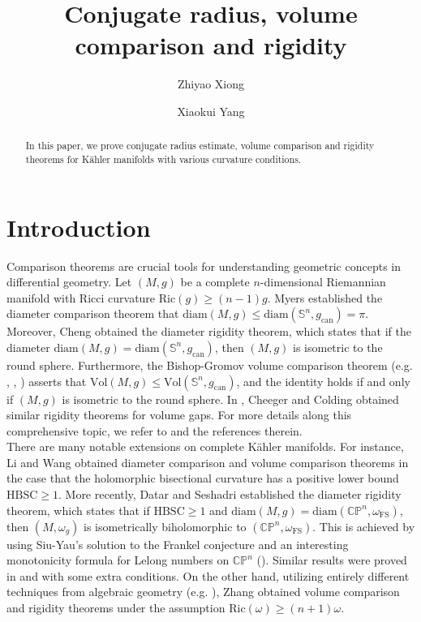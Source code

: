 \documentclass[12pt]{amsart}
\title{Conjugate radius, volume comparison and rigidity}
\author{Zhiyao Xiong}
\author{Xiaokui Yang}
\theoremstyle{plain}
\theoremstyle{definition}
\renewcommand{\S}{{\mathbb S}}
\renewcommand{\>}{\rightarrow}
\newcommand{\C}{{\mathbb C}}
\renewcommand{\P}{{\mathbb P}}
\newcommand{\om}{\omega}
\numberwithin{equation}{section} %
\begin{document}
	
	\begin{abstract} 
		In this paper, we prove conjugate radius estimate, volume comparison and rigidity theorems   for  K\"ahler manifolds with various curvature conditions.  
	\end{abstract}
	
	
	\maketitle
	
	

	
	\section{Introduction}
		
	Comparison theorems are crucial tools for understanding geometric concepts in differential geometry. 
	Let $(M,g)$ be a complete $n$-dimensional Riemannian manifold with Ricci curvature $\mathrm{Ric}(g)\geq (n-1)g$.
	Myers \cite{Mye41} established the diameter comparison theorem that $\mathrm{diam}(M,g)\leq \mathrm{diam}(\S^n,g_{\mathrm{can}})=\pi$.  Moreover,
Cheng \cite{Che75} obtained the diameter rigidity theorem, 
		which states that if the diameter $\mathrm{diam}(M,g)=\mathrm{diam}(\S^n,g_{\mathrm{can}})$, then $(M,g)$ is isometric to the round sphere. 
	Furthermore, the Bishop-Gromov volume comparison theorem (e.g. \cite{BC64}, \cite{Gro07}, \cite{CE08}) asserts that $\mathrm{Vol}(M,g)\leq \mathrm{Vol}(\S^n,g_{\mathrm{can}})$,
		and the identity holds if and only if $(M,g)$ is isometric to the round sphere. 
	In \cite{CC97}, Cheeger and Colding obtained similar rigidity theorems for volume gaps.
	For more details along this comprehensive topic, we refer to \cite{Wei07} and the references therein.\\
		
		
	There are many notable extensions on complete K\"ahler manifolds. 
	For instance, Li and Wang \cite{LW05} obtained diameter comparison and volume comparison theorems 
		in the case that the holomorphic bisectional curvature has a positive lower bound $\mathrm{HBSC}\geq 1$. 
	More recently, Datar and Seshadri \cite{DS23} established the diameter rigidity theorem, 
		which states that if $\mathrm{HBSC}\geq 1$ and $\mathrm{diam}(M,g)=\mathrm{diam}(\C\P^n, \omega_{\mathrm{FS}})$, 
		then $(M,\omega_g)$ is isometrically biholomorphic to $(\C\P^n,\omega_{\mathrm{FS}})$. 
	This is achieved by using Siu-Yau's solution to the Frankel conjecture \cite{SY80} and an interesting monotonicity formula for Lelong numbers on $\C\P^n$ (\cite{Lot21}).
	Similar results were proved in \cite{TY12} and \cite{LY18} with some extra conditions. 
	On the other hand, utilizing entirely different techniques from algebraic geometry (e.g. \cite{Fuj18}),
		Zhang \cite{Zha22} obtained volume comparison and rigidity theorems under the assumption $\mathrm{Ric}(\om)\ge (n+1)\om$.\\
		
\end{document}
